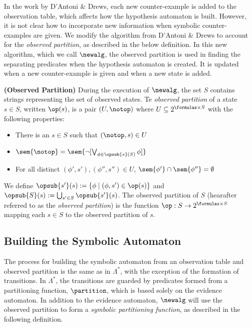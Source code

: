 

In the work by D'Antoni \& Drews, each new counter-example is added to the observation table, which affects how the hypothesis automaton is built. 
However, it is not clear how to incorporate new information when symbolic counter-examples are given. 
We modify the algorithm from D'Antoni \& Drews to account for the \emph{observed partition}, as described in the below definition. 
In this new algorithm, which we call $\newalg$, the observed partition is used in finding the separating predicates when the hypothesis automaton is created. 
It is updated when a new counter-example is given and when a new state is added.


\begin{definition}
\textbf{(Observed Partition) } 
During the execution of $\newalg$, the set $S$ contains strings representing the set of observed states. 
Te \emph{observed partition} of a state $s \in S$, written $\op(s)$, is a pair $(U, \notop)$ where $U \subseteq 2^{\formulas \times S}$ with the following properties: 
\begin{itemize}
\item There is an $s \in S$ such that $(\notop, s) \in U$
\item $\sem{\notop }= \sem{\neg [\bigvee_{\phi \in \opsub{s}(S)} \phi ]}$
\item For all distinct $(\phi',s'),(\phi'',s'')  \in U$, $\sem{\phi'} \cap \sem{\phi''} = \emptyset$
\end{itemize}
We define $\opsub{s'}(s) := \{ \phi \; | \; (\phi, s') \in \op(s) \}$ and $\opsub{S}(s) := \bigcup_{s' \in S} \opsub{s'}(s) $. 
The observed partition of $S$ (hearafter referred to as the \emph{observed partition}) is the function $\op: S \rightarrow 2^{\formulas \times S}$ mapping each $s \in S$ to the observed partition of $s$.
\end{definition}


\subsection{Building the Symbolic Automaton}

The process for building the symbolic automaton from an observation table and observed partition is the same as in $\Lambda^*$, with the exception of the formation of transitions.
In $\Lambda^*$, the transitions are guarded by predicates formed from a partitioning function, $\partition$, which is based solely on the evidence automaton. 
In addition to the evidence automaton, $\newalg$ will use the observed partition to form a \emph{symbolic partitioning function},  as described in the following definition.

